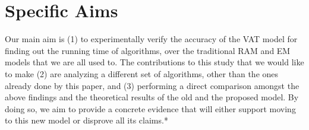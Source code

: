\section{Specific Aims}

Our main aim is (1) to experimentally verify the accuracy of the VAT model for 
finding out the running time of algorithms, over the traditional RAM and EM
models that we are all used to. The contributions to this study that we would
like to make (2) are analyzing a different set of algorithms, other than the
ones already done by this paper, and (3) performing a direct comparison amongst
the above findings and the theoretical results of the old and the proposed
model. By doing so, we aim to provide a concrete evidence that will either
support moving to this new model or disprove all its claims.*